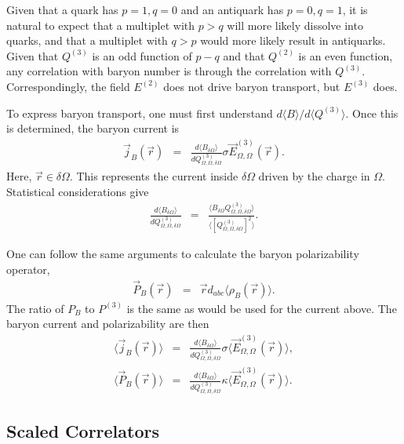 \documentclass[aps, prc, 12pt, nofootinbib, showpacs, superscriptaddress, tightenlines, groupedaddress]{revtex4-2}
\begin{document}
Given that a quark has $p=1,q=0$ and an antiquark has $p=0,q=1$, it is natural to expect that a multiplet with $p>q$ will more likely dissolve into quarks, and that a multiplet with $q>p$ would more likely result in antiquarks. Given that $Q^{(3)}$ is an odd function of $p-q$ and that $Q^{(2)}$ is an even function, any correlation with baryon number is through the correlation with $Q^{(3)}$. Correspondingly, the field $E^{(2)}$ does not drive baryon transport, but $E^{(3)}$ does.

To express baryon transport, one must first understand $d\langle B\rangle/d\langle Q^{(3)}\rangle$. Once this is determined, the baryon current is
\begin{eqnarray}
\vec{j}_B(\vec{r})&=&\frac{d\langle B_{\delta\Omega}\rangle}{dQ^{(3)}_{\Omega,\Omega,\delta\Omega}}\sigma \vec{E}^{(3)}_{\Omega,\Omega}(\vec{r}).
\end{eqnarray}
Here, $\vec{r}\in\delta\Omega$. This represents the current inside $\delta\Omega$ driven by the charge in $\Omega$. Statistical considerations give
\begin{eqnarray}
\frac{d\langle B_{\delta\Omega}\rangle}{dQ^{(3)}_{\Omega,\Omega,\delta\Omega}}&=&
\frac{\langle B_{\delta\Omega} Q^{(3)}_{\Omega,\Omega,\delta\Omega}\rangle}
{\langle [Q^{(3)}_{\Omega,\Omega,\delta\Omega}]^2  \rangle}.
\end{eqnarray}

One can follow the same arguments to calculate the baryon polarizability operator,
\begin{eqnarray}
\vec{P}_B(\vec{r})&=&\vec{r}d_{abc}\langle \rho_B(\vec{r})\rangle.
\end{eqnarray}
The ratio of $P_B$ to $P^{(3)}$ is the same as would be used for the current above. The baryon current and polarizability are then
\begin{eqnarray}
\langle\vec{j}_B(\vec{r})\rangle&=&\frac{d\langle B_{\delta\Omega}\rangle}{dQ^{(3)}_{\Omega,\Omega,\delta\Omega}}\sigma
\langle\vec{E}^{(3)}_{\Omega,\Omega}(\vec{r})\rangle,\\
\nonumber
\langle\vec{P}_B(\vec{r})\rangle&=&\frac{d\langle B_{\delta\Omega}\rangle}{dQ^{(3)}_{\Omega,\Omega,\delta\Omega}}\kappa
\langle\vec{E}^{(3)}_{\Omega,\Omega}(\vec{r})\rangle.
\end{eqnarray}

\subsection{Scaled Correlators}
\end{document}
